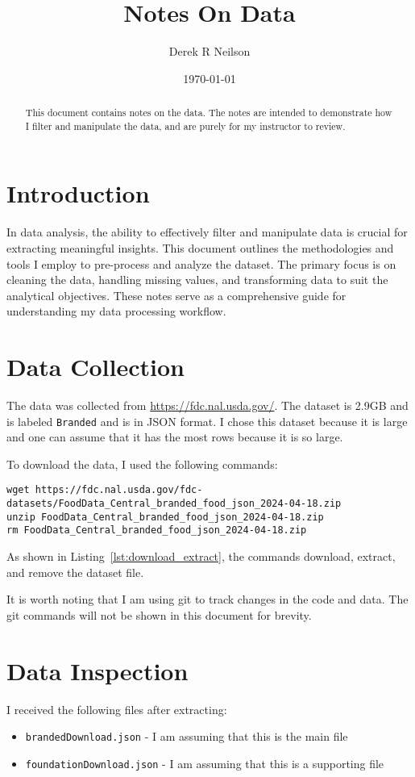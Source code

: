 \documentclass{article}
\title{Notes On Data}
\author{Derek R Neilson}
\date{\today}
\begin{document}
\maketitle

\begin{abstract}
  This document contains notes on the data. The notes are intended to demonstrate how I filter and manipulate the data, and are purely for my instructor to review.
\end{abstract}

\section{Introduction}

In data analysis, the ability to effectively filter and manipulate data is crucial for extracting meaningful insights. This document outlines the methodologies and tools I employ to pre-process and analyze the dataset. The primary focus is on cleaning the data, handling missing values, and transforming data to suit the analytical objectives. These notes serve as a comprehensive guide for understanding my data processing workflow.

\section{Data Collection}
The data was collected from \url{https://fdc.nal.usda.gov/}. The dataset is 2.9GB and is labeled \texttt{Branded} and is in JSON format. I chose this dataset because it is large and one can assume that it has the most rows because it is so large. 

To download the data, I used the following commands: 

\begin{lstlisting}[caption={Download, Extract, and Remove Zip File}, label={lst:download_extract}]
wget https://fdc.nal.usda.gov/fdc-datasets/FoodData_Central_branded_food_json_2024-04-18.zip
unzip FoodData_Central_branded_food_json_2024-04-18.zip 
rm FoodData_Central_branded_food_json_2024-04-18.zip
\end{lstlisting}

As shown in Listing~\ref{lst:download_extract}, the commands download, extract, and remove the dataset file.

It is worth noting that I am using git to track changes in the code and data. The git commands will not be shown in this document for brevity.

\section{Data Inspection}
I received the following files after extracting:
  \begin{itemize}
    \item \texttt{brandedDownload.json} - I am assuming that this is the main file
    \item \texttt{foundationDownload.json} - I am assuming that this is a supporting file
  \end{itemize}
\end{document}
